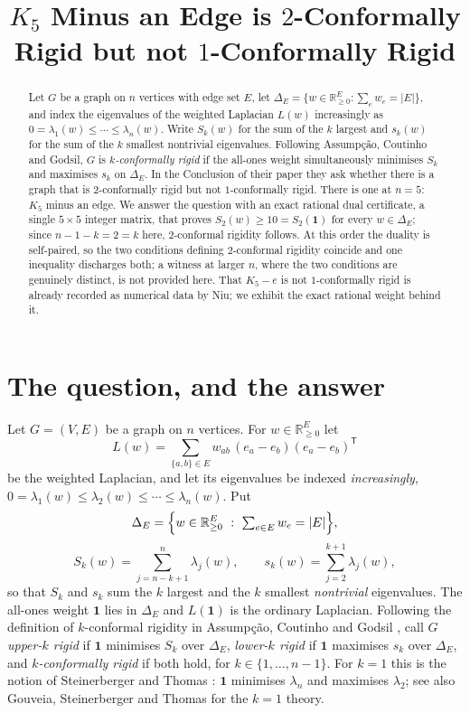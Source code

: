 \documentclass[11pt]{amsart}
\title[$K_5-e$ is $2$- but not $1$-conformally rigid]
{$K_5$ Minus an Edge is $2$-Conformally Rigid but not $1$-Conformally Rigid}
\date{}
\theoremstyle{remark}
\newcommand{\Real}{\mathbb R}
\newcommand{\DeltaE}{\Delta_E}
\newcommand{\Lop}{L}
\begin{document}
\begin{abstract}
Let $G$ be a graph on $n$ vertices with edge set $E$, let
$\DeltaE=\{w\in\Real_{\ge0}^{E}:\sum_e w_e=|E|\}$, and index the eigenvalues of the
weighted Laplacian $\Lop(w)$ increasingly as
$0=\lambda_1(w)\le\cdots\le\lambda_n(w)$. Write $S_k(w)$ for the sum of the $k$ largest
and $s_k(w)$ for the sum of the $k$ smallest nontrivial eigenvalues. Following
Assump\c{c}\~ao, Coutinho and Godsil, $G$ is \emph{$k$-conformally rigid} if the all-ones
weight simultaneously minimises $S_k$ and maximises $s_k$ on $\DeltaE$. In the Conclusion
of their paper they ask whether there is a graph that is $2$-conformally rigid but not
$1$-conformally rigid. There is one at $n=5$: $K_5$ minus an edge. We answer the question with an
exact rational dual certificate, a single $5\times5$ integer matrix, that proves
$S_2(w)\ge10=S_2(\mathbf 1)$ for every $w\in\DeltaE$; since $n-1-k=2=k$ here, $2$-conformal
rigidity follows. At this order the duality is self-paired, so the two conditions defining
$2$-conformal rigidity coincide and one inequality discharges both; a witness at larger $n$,
where the two conditions are genuinely distinct, is not provided here. That $K_5-e$ is not $1$-conformally rigid is already recorded as
numerical data by Niu; we exhibit the exact rational weight behind it.
\end{abstract}

\maketitle

\section{The question, and the answer}

Let $G=(V,E)$ be a graph on $n$ vertices. For $w\in\Real_{\ge0}^{E}$ let
\[
 \Lop(w)=\sum_{\{a,b\}\in E}w_{ab}\,(e_a-e_b)(e_a-e_b)^{\mathsf T}
\]
be the weighted Laplacian, and let its eigenvalues be indexed \emph{increasingly},
$0=\lambda_1(w)\le\lambda_2(w)\le\cdots\le\lambda_n(w)$. Put
\[
 \DeltaE=\Bigl\{w\in\Real_{\ge0}^{E}\ :\ \textstyle\sum_{e\in E}w_e=|E|\Bigr\},
\]
\[
 S_k(w)=\sum_{j=n-k+1}^{n}\lambda_j(w),
 \qquad
 s_k(w)=\sum_{j=2}^{k+1}\lambda_j(w),
\]
so that $S_k$ and $s_k$ sum the $k$ largest and the $k$ smallest \emph{nontrivial}
eigenvalues. The all-ones weight $\mathbf 1$ lies in $\DeltaE$ and $\Lop(\mathbf 1)$ is the
ordinary Laplacian. Following the definition of $k$-conformal rigidity in
Assump\c{c}\~ao, Coutinho and Godsil \cite{ACG}, call $G$
\emph{upper-$k$ rigid} if $\mathbf 1$ minimises $S_k$
over $\DeltaE$, \emph{lower-$k$ rigid} if $\mathbf 1$ maximises $s_k$ over $\DeltaE$, and
\emph{$k$-conformally rigid} if both hold, for $k\in\{1,\dots,n-1\}$. For $k=1$ this is the
notion of Steinerberger and Thomas \cite{ST}: $\mathbf 1$ minimises $\lambda_n$ and
maximises $\lambda_2$; see also Gouveia, Steinerberger and Thomas \cite{GST} for the
$k=1$ theory.
\end{document}
